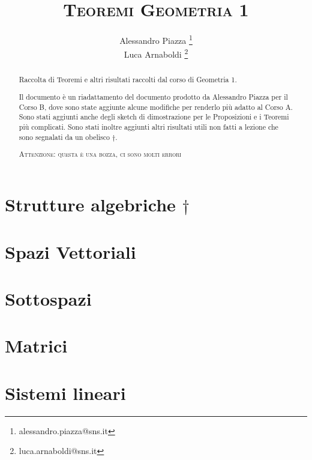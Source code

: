 \documentclass[9pt, a4paper]{article}
\title{\textsc{Teoremi Geometria 1}}
\author{Alessandro Piazza \thanks{alessandro.piazza@sns.it} \\ 
		Luca Arnaboldi \thanks{luca.arnaboldi@sns.it}}
\theoremstyle{mythm}
\begin{document}
\maketitle

\begin{abstract}
	Raccolta di Teoremi e altri risultati raccolti dal corso di Geometria 1.
	
	Il documento è un riadattamento del documento prodotto da Alessandro Piazza per il Corso B, dove sono state aggiunte alcune modifiche per renderlo più adatto al Corso A. 
	Sono stati aggiunti anche degli sketch di dimostrazione per le Proposizioni e i Teoremi più complicati. 
	Sono stati inoltre aggiunti altri risultati utili non fatti a lezione che sono segnalati da un obelisco $\dagger$. 
	\begin{center}
		\textsc{Attenzione: questa è una bozza, ci sono molti errori}
	\end{center}
\end{abstract}

\tableofcontents

\clearpage

\section{Strutture algebriche $ \dagger $}


\clearpage

\section{Spazi Vettoriali}


\clearpage

\section{Sottospazi}


\clearpage

\section{Matrici}


\clearpage

\section{Sistemi lineari}

\end{document}
